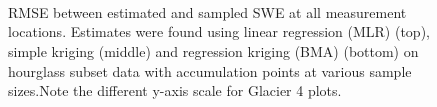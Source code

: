 \documentclass[12pt]{article}
\begin{document}
\begin{figure}[H]
	\centering
	\\
	\\
	\\
	\caption{RMSE between estimated and sampled SWE at all measurement locations. Estimates were found using linear regression (MLR) (top), simple kriging (middle) and regression kriging (BMA) (bottom) on hourglass subset data with accumulation points at various sample sizes.Note the different y-axis scale for Glacier 4 plots.}
	\label{fig:SubsetRMSE_samplesizeNdensity_Ahourglass}
\end{figure}
\end{document}
